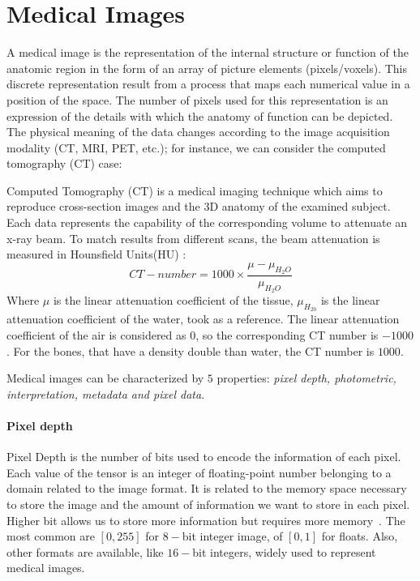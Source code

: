 \documentclass{standalone}
\begin{document}
	\section{Medical Images}
	
	A medical image is the representation of the internal structure or function of the anatomic region in the form of an array of picture elements (pixels/voxels). 
	This discrete representation result from a process that maps each numerical value in a position of the space. The number of pixels used for this representation is an expression of the details with which the anatomy of function can be depicted. The physical meaning of the data changes according to the image acquisition modality (CT, MRI, PET, etc.); for instance, we can consider the computed tomography (CT) case: 
	
	Computed Tomography (CT) is a medical imaging technique which aims to reproduce cross-section images and the 3D anatomy of the examined subject. Each data represents the capability of the corresponding volume to attenuate an x-ray beam. To match results from different scans, the beam attenuation is measured in Hounsfield Units(HU) : 
	\begin{equation}\label{eq:HU}
		CT-number = 1000\times\frac{\mu - \mu_{H_2O}}{\mu_{H_2O}}
	\end{equation}
	Where $\mu$ is the linear attenuation coefficient of the tissue, $\mu_{H_20}$ is the linear attenuation coefficient of the water, took as a reference. The linear attenuation coefficient of the air is considered as $0$, so the corresponding CT number is $-1000$. For the bones, that have a density double than water, the CT number is $1000$.
	
	Medical images can be characterized by $5$ properties: \emph{pixel depth, photometric, interpretation, metadata and pixel data}. 
	
	\paragraph*{Pixel depth} Pixel Depth is the number of bits used to encode the information of each pixel. Each value of the tensor is an integer of floating-point number belonging to a domain related to the image format. It is related to the memory space necessary to store the image and the amount of information we want to store in each pixel. Higher bit allows us to store more information but requires more memory~\cite{ART:Larobina}. The most common are $[0, 255]$ for $8-$bit integer image, of $[0, 1]$ for floats. Also, other formats are available, like $16-$bit integers, widely used to represent medical images. 
	
\end{document}
